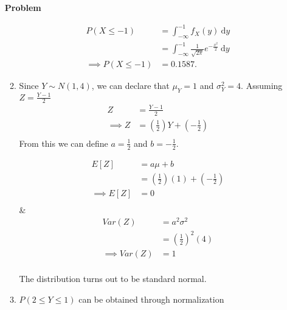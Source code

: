 \documentclass[12pt]{article}
\newenvironment{Ex}{\textbf{Problem}\vspace{.75em}\\}{}
\newcommand{\dd}[1]{\:\mathrm{d}{#1}}
\begin{document}
\begin{enumerate}
\begin{Ex}
\begin{solution}
\begin{enumerate}
\begin{multicols}{2}
\begin{equation}
            \begin{aligned}
              P(X\le -1) &= \int_{-\infty}^{-1} f_X(y) \dd{y} \\
              &= \int_{-\infty}^{-1} \frac{1}{\sqrt{2\pi}}e^{-\frac{x^2}{2}}
              \dd{y} \\
              \implies P(X \le -1 )&= 0.1587.
            \end{aligned}
          \end{equation}
        \end{multicols}
      \item Since $Y \sim N(1,4)$, we can declare that $\mu_Y = 1$ and
        $\sigma^2_Y = 4$. Assuming $Z = \frac{Y-1}{2}$
        \begin{equation}
          \label{eq:2b-z}
          \begin{aligned}
            Z &= \frac{Y-1}{2} \\
            \implies Z &= \left(\frac{1}{2}\right)Y + \left(-\frac{1}{2}\right) \\
          \end{aligned}
        \end{equation}
        From this we can define $a = \frac{1}{2}$ and $b = -\frac{1}{2}$.
        \begin{multicols}{2}
          \begin{equation}
            \label{eq:2b-e-sol}
            \begin{aligned}
              E[Z] &= a\mu + b \\
              &= \left(\frac{1}{2}\right)(1) + \left(-\frac{1}{2}\right) \\
              \implies E[Z] &= 0\\
            \end{aligned}
          \end{equation} &
          \begin{equation}
            \label{eq:2b-var-sol}
            \begin{aligned}
              Var(Z)&=a^2\sigma^2 \\
              &=\left(\frac{1}{2}\right)^2(4) \\
              \implies Var(Z)&=1 \\
            \end{aligned}
          \end{equation}
        \end{multicols}
        The distribution turns out to be standard normal.
      \item $P(2 \le Y \le 1)$ can be obtained through normalization

\end{enumerate}
\end{solution}
\end{Ex}
\end{enumerate}
\end{document}
